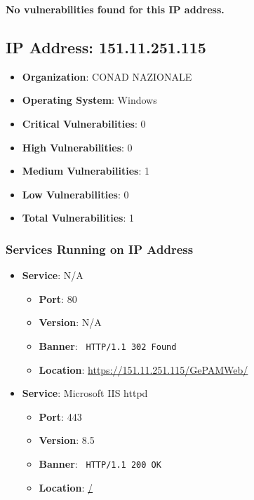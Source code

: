 \documentclass{article}
\begin{document}
\textbf{No vulnerabilities found for this IP address.}


\clearpage



\subsection*{IP Address: 151.11.251.115}

\begin{itemize}
    \item \textbf{Organization}: CONAD NAZIONALE
    \item \textbf{Operating System}:  Windows 
    \item \textbf{Critical Vulnerabilities}: 0
    \item \textbf{High Vulnerabilities}: 0
    \item \textbf{Medium Vulnerabilities}: 1
    \item \textbf{Low Vulnerabilities}: 0
    \item \textbf{Total Vulnerabilities}: 1
\end{itemize}

\subsubsection*{Services Running on IP Address}

\begin{itemize}
    
        \item \textbf{Service}: N/A
        \begin{itemize}
            \item \textbf{Port}: 80
            \item \textbf{Version}:  N/A 
            \item \textbf{Banner}: \texttt{ HTTP/1.1 302 Found
 }
            \item \textbf{Location}: \href{ https://151.11.251.115/GePAMWeb/ }{ https://151.11.251.115/GePAMWeb/ }
        \end{itemize}
    
        \item \textbf{Service}: Microsoft IIS httpd
        \begin{itemize}
            \item \textbf{Port}: 443
            \item \textbf{Version}:  8.5 
            \item \textbf{Banner}: \texttt{ HTTP/1.1 200 OK
 }
            \item \textbf{Location}: \href{ / }{ / }
        \end{itemize}
    
\end{itemize}
\end{document}
